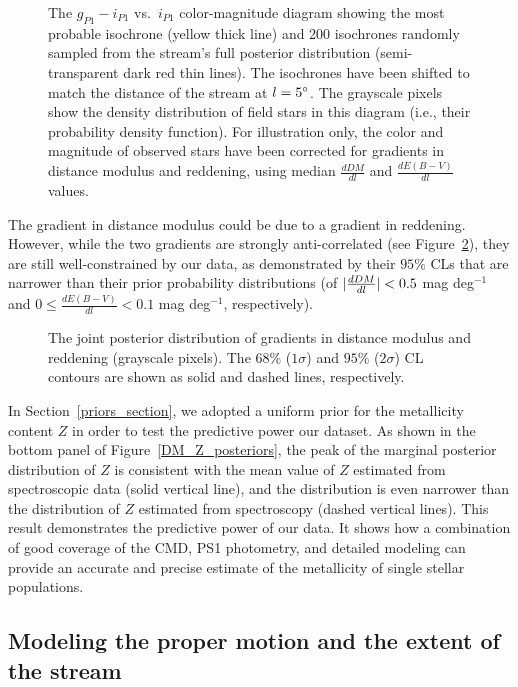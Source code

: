 \documentclass[iop]{emulateapj}
\begin{document}
\begin{figure}
\caption{
The $g_{P1}-i_{P1}$ vs.~$i_{P1}$ color-magnitude diagram showing the most
probable isochrone (yellow thick line) and 200 isochrones randomly sampled from 
the stream's full posterior distribution (semi-transparent dark red thin lines).
The isochrones have been shifted to match the distance of the stream at
$l=5\mbox{$^\circ$}$. The grayscale pixels show the density distribution of field stars 
in this diagram (i.e., their probability density function). For illustration
only, the color and magnitude of observed stars have been corrected for
gradients in distance modulus and reddening, using median $\frac{dDM}{dl}$ and
$\frac{dE(B-V)}{dl}$ values.
\label{CMD_models}}
\end{figure}

The gradient in distance modulus could be due to a gradient in reddening.
However, while the two gradients are strongly anti-correlated (see
Figure~\ref{DeltaDM_vs_DeltaEBV}), they are still well-constrained by our data,
as demonstrated by their $95\%$ CLs that are narrower than their prior
probability distributions (of $\arrowvert\frac{dDM}{dl}\arrowvert< 0.5$ mag
deg$^{-1}$ and $0 \leq \frac{dE(B-V)}{dl} < 0.1$ mag deg$^{-1}$, respectively).

\begin{figure}
\caption{
The joint posterior distribution of gradients in distance modulus and reddening
(grayscale pixels). The $68\%$ ($1\sigma$) and $95\%$ ($2\sigma$) CL  contours
are shown as solid and dashed lines, respectively.
\label{DeltaDM_vs_DeltaEBV}}
\end{figure}

In Section~\ref{priors_section}, we adopted a uniform prior for the metallicity
content $Z$ in order to test the predictive power our dataset. As shown in the
bottom panel of Figure~\ref{DM_Z_posteriors}, the peak of the marginal posterior
distribution of $Z$ is consistent with the mean value of $Z$ estimated from
spectroscopic data (solid vertical line), and the distribution is even narrower 
than the distribution of $Z$ estimated from spectroscopy (dashed vertical
lines). This result demonstrates the predictive power of our data. It shows how 
a combination of good coverage of the CMD, PS1 photometry, and detailed modeling
can provide an accurate and precise estimate of the metallicity of single
stellar populations.

\subsection{Modeling the proper motion and the extent of the stream\label{proper_motion_extent}}
\end{document}
